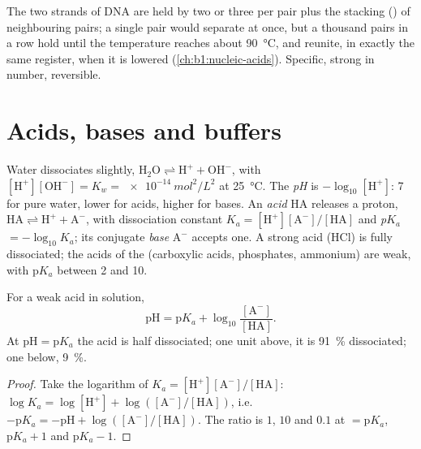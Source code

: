 \begin{example}\label{ex:b1:water-small-molecules:melting}
The two strands of DNA are held by two or three  per
 pair plus the stacking () of neighbouring pairs; a
single pair would separate at once, but a thousand pairs in a row hold
until the temperature reaches about \qty{90}{\celsius}, and reunite,
in exactly the same register, when it is lowered
(\cref{ch:b1:nucleic-acids}). Specific, strong in number, reversible.
\end{example}

\section{Acids, bases and buffers}

\begin{definition}\label{def:b1:water-small-molecules:ph}
Water dissociates slightly, $\mathrm{H_2O} \rightleftharpoons
\mathrm{H^+} + \mathrm{OH^-}$, with $[\mathrm{H^+}][\mathrm{OH^-}] =
K_w = \qty{e-14}{mol^2/L^2}$ at \qty{25}{\celsius}. The
\emph{pH} is $-\log_{10}[\mathrm{H^+}]$: 7 for pure water,
lower for acids, higher for bases. An \emph{acid} $\mathrm{HA}$
releases a proton, $\mathrm{HA} \rightleftharpoons \mathrm{H^+} +
\mathrm{A^-}$, with dissociation constant $K_a =
[\mathrm{H^+}][\mathrm{A^-}]/[\mathrm{HA}]$ and
\emph{p$K_a$} $= -\log_{10}K_a$; its conjugate
\emph{base} $\mathrm{A^-}$ accepts one. A strong acid
(HCl) is fully dissociated; the acids of the  (carboxylic acids,
phosphates, ammonium) are weak, with p$K_a$ between 2 and 10.
\end{definition}

\begin{theorem}\label{thm:b1:water-small-molecules:hh}
For a weak acid in solution,
\[
\mathrm{pH} = \mathrm{p}K_a + \log_{10}\frac{[\mathrm{A^-}]}{[\mathrm{HA}]} .
\]
At $\mathrm{pH} = \mathrm{p}K_a$ the acid is half dissociated; one 
unit above, it is \qty{91}{\%} dissociated; one below, \qty{9}{\%}.
\end{theorem}
\begin{proof}
Take the logarithm of $K_a = [\mathrm{H^+}][\mathrm{A^-}]/[\mathrm{HA}]$:
$\log K_a = \log[\mathrm{H^+}] + \log([\mathrm{A^-}]/[\mathrm{HA}])$,
i.e.\ $-\mathrm{p}K_a = -\mathrm{pH} + \log([\mathrm{A^-}]/[\mathrm{HA}])$.
The ratio is $1$, $10$ and $0.1$ at  $= \mathrm{p}K_a$, $\mathrm{p}K_a + 1$
and $\mathrm{p}K_a - 1$.
\end{proof}

